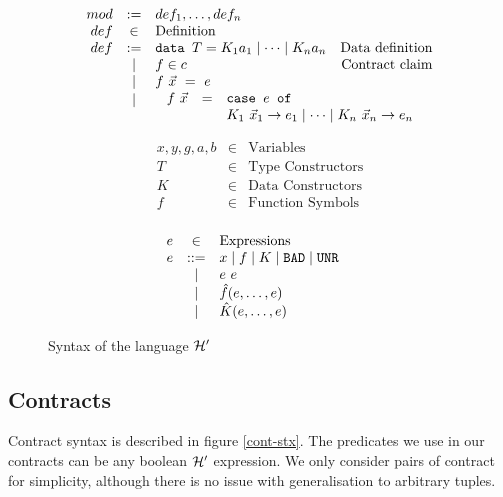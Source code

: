 \documentclass[preprint]{sigplanconf}
\begin{document}
\begin{figure}[h]
  \centering
  \[
  \begin{array}{rclr}
    mod &:=& def_1,\dots,def_n &\\
    def &\in& \mbox{Definition} & \\
    def &:=& \texttt{data } T = K_1 a_1 \mid \cdots \mid K_n a_n& \mbox{Data definition}\\
    &\mid& f \in c & \mbox{Contract claim}\\
    &\mid& f~\vec{x}~=~e & \\
    &\raisebox{ 0.18 cm }{$\mid$}& \multicolumn{2}{c}{
      \begin{array}{rcl}
        \hspace{-0.2cm} f~\vec{x} &=& \texttt{case } e \texttt{ of } \\
         && K_1~\vec{x}_1 \to e_1 \mid \cdots \mid K_n~\vec{x}_n \to e_n \\
       \end{array}
       } \\
  \end{array} \]
  
  \[  \begin{array}{rclr}
    x,y,g,a,b & \in & \mbox{Variables} \\
    T &\in& \mbox{Type Constructors} \\
    K &\in& \mbox{Data Constructors} \\
    f &\in& \text{Function Symbols} \\
  \end{array} \]

  \[  \begin{array}{rclr}
    e &\in& \mbox{Expressions} & \\
    e &::=& x \mid f \mid K \mid \texttt{BAD} \mid \texttt{UNR} & \\
    &\mid& e~e & \\
    &\mid& \hat{f}(e,\dots,e) & \\
    &\mid& \hat{K}(e,\dots,e) & \\
  \end{array} \]

\caption{Syntax of the language $\mathcal{H}'$}
\label{hprime-stx}
\end{figure}


\subsection{Contracts}
Contract syntax is described in figure \ref{cont-stx}. The predicates
we use in our contracts can be any boolean $\mathcal{H}'$ expression. We
only consider pairs of contract for simplicity, although there is no
issue with generalisation to arbitrary tuples.
\end{document}
